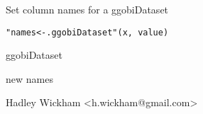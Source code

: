 \begin{Description}\relax
Set column names for a ggobiDataset
\end{Description}
\begin{Usage}
\begin{verbatim}"names<-.ggobiDataset"(x, value)\end{verbatim}
\end{Usage}
\begin{Arguments}
\begin{ldescription}
\item[\code{x}] ggobiDataset
\item[\code{value}] new names
\end{ldescription}
\end{Arguments}
\begin{Details}\relax
\end{Details}
\begin{Author}\relax
Hadley Wickham <h.wickham@gmail.com>
\end{Author}
\begin{Examples}
\begin{ExampleCode}\end{ExampleCode}
\end{Examples}

